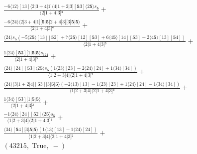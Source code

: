 \documentclass[varwidth, border=5pt]{standalone}
\begin{document}
\begin{my}
$\begin{gathered}
\scriptscriptstyle\frac{-6⟨12⟩[13]⟨2|3+4|1]⟨4|1+2|3][𝟓3]⟨2𝟓⟩s_{𝟓}}{⟨2|1+4|3]⁵} +\\
\scriptscriptstyle\frac{-6⟨24⟩⟨2|3+4|1][𝟓|𝟓|2+4|3][3|𝟓|𝟓⟩}{⟨2|1+4|3]⁴} +\\
\scriptscriptstyle\frac{⟨24⟩s_{𝟓}(-5⟨2𝟓⟩[13][𝟓2]+7⟨2𝟓⟩[12][𝟓3]+6⟨4𝟓⟩[14][𝟓3]-2⟨4𝟓⟩[13][𝟓4])}{⟨2|1+4|3]³} +\\
\scriptscriptstyle\frac{1⟨24⟩[𝟓3][1|𝟓|𝟓⟩s_{124}}{⟨2|1+4|3]³} +\\
\scriptscriptstyle\frac{⟨24⟩[24][𝟓3]⟨2𝟓⟩s_{𝟓}(1⟨23⟩[23]-2⟨24⟩[24]+1⟨34⟩[34])}{⟨1|2+3|4]⟨2|1+4|3]³} +\\
\scriptscriptstyle\frac{⟨24⟩⟨3|1+2|4][𝟓3][3|𝟓|𝟓⟩(-2⟨13⟩[13]-1⟨23⟩[23]+1⟨24⟩[24]-1⟨34⟩[34])}{⟨1|2+3|4]⟨2|1+4|3]³} +\\
\scriptscriptstyle\frac{1⟨34⟩[𝟓3][1|𝟓|𝟓⟩}{⟨2|1+4|3]²} +\\
\scriptscriptstyle\frac{-1⟨24⟩[24][𝟓2]⟨2𝟓⟩s_{𝟓}}{⟨1|2+3|4]⟨2|1+4|3]²} +\\
\scriptscriptstyle\frac{⟨34⟩[𝟓4][3|𝟓|𝟓⟩(1⟨13⟩[13]-1⟨24⟩[24])}{⟨1|2+3|4]⟨2|1+4|3]²} +\\
\scriptscriptstyle(43215,\;\text{True},\;-) \phantom{+}
\end{gathered}$
\end{my}
\end{document}
